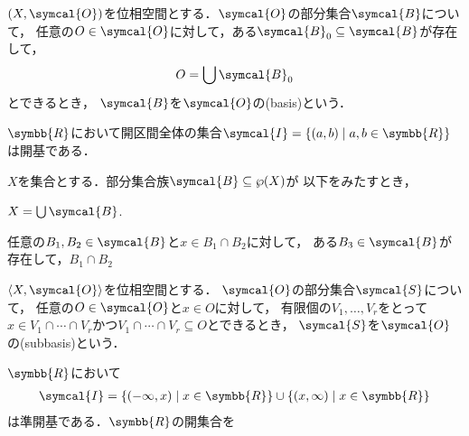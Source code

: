 \documentclass[../main.tex]{subfiles}
\begin{document}
\begin{thmbox}
\begin{definition}
\((X, \symcal{O})\)を位相空間とする．\(\symcal{O}\)の部分集合\(\symcal{B}\)について，
任意の\(O \in \symcal{O}\)に対して，ある\(\symcal{B}_0 \subseteq \symcal{B}\)が存在して，
\begin{align*}
    O = \bigcup \symcal{B}_0
\end{align*}
とできるとき，
\(\symcal{B}\)を\(\symcal{O}\)の(basis)という．
\end{definition}
\end{thmbox}

\begin{example} \(\symbb{R}\)において開区間全体の集合\(\symcal{I} = \{ (a, b) \mid a,  b \in \symbb{R}\}\)は開基である．
\end{example}

\begin{thmbox}
\begin{theorem}
\(X\)を集合とする．部分集合族\(\symcal{B} \subseteq \wp(X)\)が
以下をみたすとき，
\begin{conditions}
    \item \(X = \bigcup \symcal{B}\).
    \item 任意の\(B_1, B_2 \in \symcal{B}\)と\(x \in B_1 \cap B_2\)に対して，
        ある\(B_3 \in \symcal{B}\)が存在して，\(B_1 \cap B_2\)
\end{conditions}
\end{theorem}
\end{thmbox}

\begin{thmbox}
\begin{definition}
\(\tuple{X, \symcal{O}}\)を位相空間とする．
\(\symcal{O}\)の部分集合\(\symcal{S}\)について，
任意の\(O \in \symcal{O}\)と\(x \in O\)に対して，
有限個の\(V_1, \ldots, V_r \)をとって
\(x \in V_1 \cap \cdots \cap V_r\)かつ\(V_1 \cap \cdots \cap V_r \subseteq O\)とできるとき，
\(\symcal{S}\)を\(\symcal{O}\)の(subbasis)という．
\end{definition}
\end{thmbox}

\begin{example} \(\symbb{R}\)において
\begin{align*}
    \symcal{I} =
        \{ (-\infty, x) \mid x \in \symbb{R} \}
        \cup
        \{ (x, \infty) \mid x \in \symbb{R} \}
\end{align*}
は準開基である．\(\symbb{R}\)の開集合を
\end{example}
\end{document}
